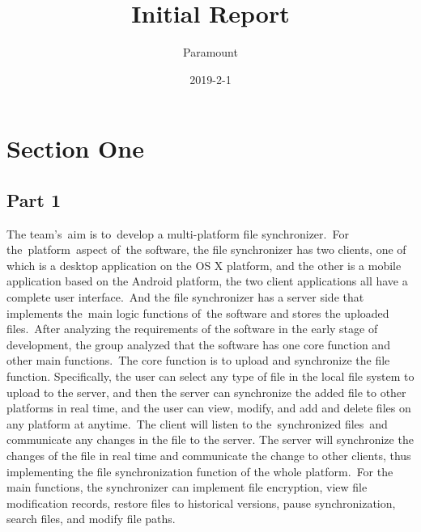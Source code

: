 \documentclass{article}
\begin{document}
	\title{Initial Report}
	\author{Paramount}
	\date{2019-2-1}
	\maketitle
	
	\fontsize{11 pt}{0}
	
	\section{Section One}
	
	\subsection{Part 1}
	
	The team’s aim is to develop a multi-platform file synchronizer. For the platform aspect of the software, the file synchronizer has two clients, one of which is a desktop application on the OS X platform, and the other is a mobile application based on the Android platform, the two client applications all have a complete user interface. And the file synchronizer has a server side that implements the main logic functions of the software and stores the uploaded files. After analyzing the requirements of the software in the early stage of development, the group analyzed that the software has one core function and other main functions. The core function is to upload and synchronize the file function. Specifically, the user can select any type of file in the local file system to upload to the server, and then the server can synchronize the added file to other platforms in real time, and the user can view, modify, and add and delete files on any platform at anytime. The client will listen to the synchronized files and communicate any changes in the file to the server. The server will synchronize the changes of the file in real time and communicate the change to other clients, thus implementing the file synchronization function of the whole platform. For the main functions, the synchronizer can implement file encryption, view file modification records, restore files to historical versions, pause synchronization, search files, and modify file paths.
	\\ \hspace*{\fill} \\
\end{document}
